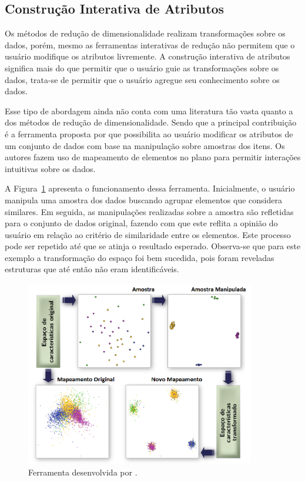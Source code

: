 \subsection{Construção Interativa de Atributos}\label{sec:tr}

Os métodos de redução de dimensionalidade realizam
transformações sobre os dados, porém, mesmo as ferramentas
interativas de redução não permitem que o usuário modifique
os atributos livremente. A construção interativa de
atributos significa mais do que permitir que o usuário guie
as transformações sobre os dados, trata-se de permitir que o
usuário agregue seu conhecimento sobre os dados. 

Esse tipo de abordagem ainda não conta com uma literatura
tão vasta quanto a dos métodos de redução de
dimensionalidade. Sendo que a principal contribuição é a
ferramenta proposta por \citet{Gladys2013} que possibilita ao
usuário modificar os atributos de um conjunto de dados com
base na manipulação sobre amostras dos itens. Os autores
fazem uso de mapeamento de elementos no plano para permitir
interações intuitivas sobre os dados. 

A Figura~\ref{fig:ud} apresenta  o funcionamento dessa
ferramenta. Inicialmente, o usuário manipula uma amostra dos
dados buscando  agrupar elementos que considera similares.
Em seguida, as manipulações realizadas sobre a amostra são
refletidas para o conjunto de dados original, fazendo com
que este reflita a opinião do usuário em relação ao critério
de similaridade entre os elementos. Este processo pode ser
repetido até que se atinja o resultado esperado. Observa-se
que para este exemplo a transformação do espaço foi bem
sucedida, pois foram reveladas estruturas que até então não
eram identificáveis.

\begin{figure}[h!]
    \centering
    \includegraphics[width=10cm]{images/ud.png}
    \caption{Ferramenta desenvolvida por \cite{Gladys2013}.}
    \label{fig:ud}
\end{figure}

